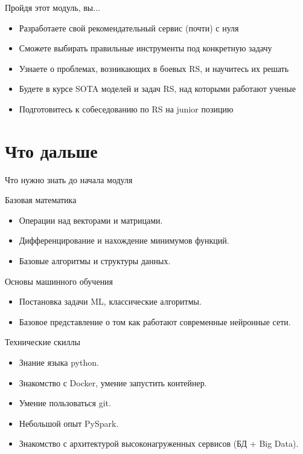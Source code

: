 \documentclass[11pt,aspectratio=169,handout]{beamer}
\begin{document}
\begin{frame}{Пройдя этот модуль, вы...}

\begin{itemize}
\item Разработаете свой рекомендательный сервис (почти) с нуля
\item Сможете выбирать правильные инструменты под конкретную задачу
\item Узнаете о проблемах, возникающих в боевых RS, и научитесь их решать
\item Будете в курсе SOTA моделей и задач RS, над которыми работают ученые
\item Подготовитесь к собеседованию по RS на junior позицию
\end{itemize}

\end{frame}

{
\begin{frame}[plain]
\end{frame}
}

\section{Что дальше}

\begin{frame}{Что нужно знать до начала модуля}

\begin{footnotesize}

Базовая математика
\begin{itemize}
\item Операции над векторами и матрицами.
\item Дифференцирование и нахождение минимумов функций.
\item Базовые алгоритмы и структуры данных.
\end{itemize}

Основы машинного обучения
\begin{itemize}
\item Постановка задачи ML, классические алгоритмы.
\item Базовое представление о том как работают современные нейронные сети.
\end{itemize}

Технические скиллы
\begin{itemize}
\item Знание языка python.
\item Знакомство с Docker, умение запустить контейнер.
\item Умение пользоваться git.
\item Небольшой опыт PySpark.
\item Знакомство с архитектурой высоконагруженных сервисов (БД + Big Data).
\end{itemize}

\end{footnotesize}

\end{frame}
\end{document}
